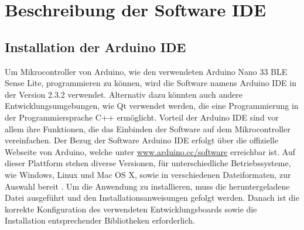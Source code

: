 %
%
%

\chapter{Beschreibung der Software IDE}

\section{Installation der Arduino IDE}
Um Mikrocontroller von Arduino, wie den verwendeten Arduino Nano 33 BLE Sense Lite, programmieren zu können, wird die Software namens Arduino IDE in der Version 2.3.2 verwendet. 
Alternativ dazu könnten auch andere Entwicklungsumgebungen, wie Qt verwendet werden, die eine Programmierung in der Programmiersprache C++ ermöglicht.
Vorteil der Arduino IDE sind vor allem ihre Funktionen, die das Einbinden der Software auf dem Mikrocontroller vereinfachen.
Der Bezug der Software Arduino IDE erfolgt über die offizielle Webseite von Arduino, welche unter \url{www.arduino.cc/software} erreichbar ist. Auf dieser Plattform stehen diverse Versionen, für unterschiedliche Betriebssysteme, wie Windows, Linux und Mac OS X, sowie in verschiedenen Dateiformaten, zur Auswahl bereit \cite{ArdIDE.2024}. Um die Anwendung zu installieren, muss die heruntergeladene Datei ausgeführt und den Installationsanweisungen gefolgt werden. Danach ist die korrekte Konfiguration des verwendeten Entwicklungsboards sowie die Installation entsprechender Bibliotheken erforderlich.

